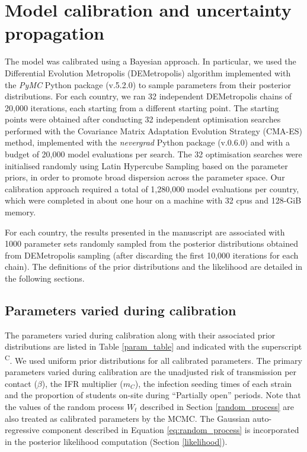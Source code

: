 \section{Model calibration and uncertainty propagation}
\label{calibration}
The model was calibrated using a Bayesian approach. In particular, we used the Differential Evolution Metropolis 
(DEMetropolis) algorithm implemented with the \textit{PyMC} Python package (v.5.2.0) to sample parameters from their 
posterior distributions. For each country, we ran 32 independent DEMetropolis chains of 20,000 iterations, each 
starting from a different starting point. The starting points were obtained after conducting 32 independent optimisation 
searches performed with the Covariance Matrix Adaptation Evolution Strategy (CMA-ES) method, implemented with the
\textit{nevergrad} Python package (v.0.6.0) and with a budget of 20,000 model evaluations per search. 
The 32 optimisation searches were initialised randomly using Latin Hypercube Sampling based on the parameter priors, 
in order to promote broad dispersion across the parameter space. Our calibration approach required a total of 1,280,000
model evaluations per country, which were completed in about one hour on a machine with 32 cpus and 128-GiB memory.

For each country, the results presented in the manuscript are associated with 1000 parameter sets randomly sampled from 
the posterior distributions obtained from DEMetropolis sampling (after discarding the first 10,000 iterations for each chain). 
The definitions of the prior distributions and the likelihood are detailed in the following sections.

\subsection{Parameters varied during calibration}

The parameters varied during calibration along with their associated prior distributions 
are listed in Table \ref{param_table} and indicated with the superscript \textsuperscript{C}.
We used uniform prior distributions for all calibrated parameters. The primary parameters varied during calibration are 
the unadjusted risk of transmission per contact ($\beta$), the IFR multiplier ($m_C$), the infection seeding times of 
each strain and the proportion of students on-site during ``Partially open'' periods. Note that the values of the random 
process $W_t$ described in Section \ref{random_process} are also treated as calibrated parameters by the MCMC. The Gaussian 
auto-regressive component described in Equation \ref{eq:random_process} is incorporated in the posterior likelihood 
computation (Section \ref{likelihood}).

